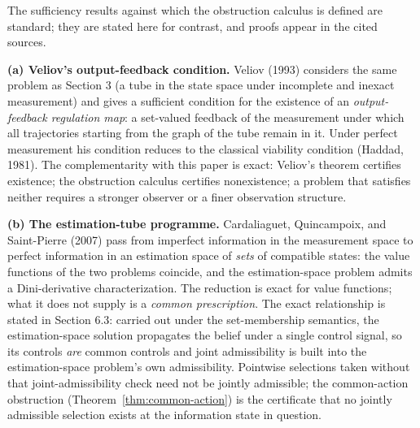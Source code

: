 \documentclass[11pt]{article}
\theoremstyle{definition}
\begin{document}
The sufficiency results against which the obstruction calculus is
defined are standard; they are stated here for contrast, and proofs
appear in the cited sources.

\textbf{(a) Veliov's output-feedback condition.} Veliov (1993) considers the same problem as Section 3 (a tube in the state space under incomplete and inexact measurement) and gives a sufficient condition for the
existence of an \emph{output-feedback regulation map}: a set-valued
feedback of the measurement under which all trajectories starting from
the graph of the tube remain in it. Under perfect measurement his
condition reduces to the classical viability condition (Haddad, 1981).
The complementarity with this paper is exact: Veliov's theorem certifies
existence; the obstruction calculus certifies nonexistence; a problem that satisfies neither requires a stronger observer or a finer observation structure.

\textbf{(b) The estimation-tube programme.} Cardaliaguet, Quincampoix,
and Saint-Pierre (2007) pass from imperfect information in the
measurement space to perfect information in an estimation space of
\emph{sets} of compatible states: the value functions of the two
problems coincide, and the estimation-space problem admits a
Dini-derivative characterization. The reduction is exact for value
functions; what it does not supply is a \emph{common prescription}. The exact relationship is stated in Section 6.3: carried out under the set-membership semantics, the estimation-space solution propagates the belief under a single control signal, so its controls \emph{are} common controls and joint admissibility is built into the estimation-space problem's own admissibility. Pointwise selections taken without that joint-admissibility check need not be jointly admissible; the common-action obstruction (Theorem~\ref{thm:common-action}) is the certificate that no jointly admissible selection exists at the information state in question.
\end{document}
